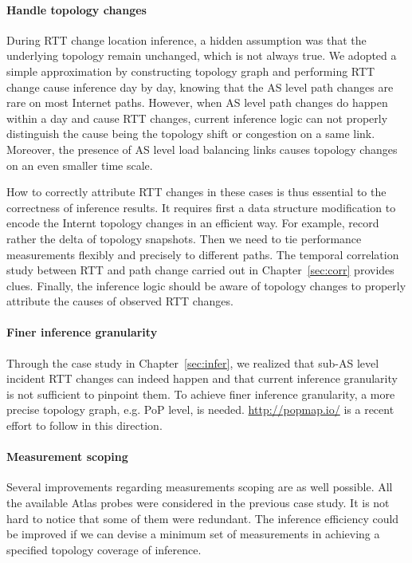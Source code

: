 \paragraph*{Handle topology changes} During RTT change location inference, a hidden assumption was that the underlying topology remain unchanged, which is not always true. We adopted a simple approximation by constructing topology graph and performing RTT change cause inference day by day, knowing that the AS level path changes are rare on most Internet paths. 
However, when AS level path changes do happen within a day and cause RTT changes, current inference logic can not properly distinguish the cause being the topology shift or congestion on a same link.
Moreover, the presence of AS level load balancing links causes topology changes on an even smaller time scale. 

How to correctly attribute RTT changes in these cases is thus essential to the correctness of inference results.
It requires first a data structure modification to encode the Internt topology changes in an efficient way. For example, record rather the delta of topology snapshots.
Then we need to tie performance measurements flexibly and precisely to different paths. The temporal correlation study between RTT and path change carried out in Chapter~\ref{sec:corr} provides clues.
Finally, the inference logic should be aware of topology changes to properly attribute the causes of observed RTT changes.

\paragraph*{Finer inference granularity} Through the case study in Chapter~\ref{sec:infer}, we realized that sub-AS level incident RTT changes can indeed happen and that current inference granularity is not sufficient to pinpoint them.
To achieve finer inference granularity, a more precise topology graph, e.g. \ac{PoP} level, is needed. \url{http://popmap.io/} is a recent effort to follow in this direction.

\paragraph*{Measurement scoping} Several improvements regarding measurements scoping are as well possible. All the available Atlas probes were considered in the previous case study. It is not hard to notice that some of them were redundant.
The inference efficiency could be improved if we can devise a minimum set of measurements in achieving a specified topology coverage of inference.


